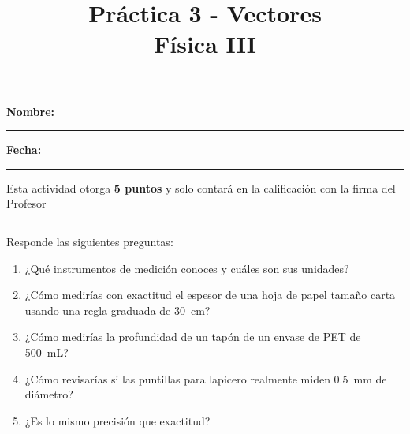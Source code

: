 \documentclass[14pt]{extarticle}
\title{\vspace*{-2cm} Práctica 3 - Vectores \\  Física III\vspace{-5ex}}
\date{}
\begin{document}
\maketitle

\textbf{Nombre:} \rule{7cm}{0.1mm} \textbf{Fecha:} \rule{3cm}{0.1mm}

\vspace{1cm}

\large
Esta actividad otorga \textbf{5 puntos} y solo contará en la calificación con la firma del Profesor \rule{4cm}{0.1mm}

\vspace*{1cm}
Responde las siguientes preguntas:

\begin{enumerate}
\itemsep4em
\item ¿Qué instrumentos de medición conoces y cuáles son sus unidades?
\item ¿Cómo medirías con exactitud el espesor de una hoja de papel tamaño carta usando una regla graduada de \SI{30}{\centi\meter}?
\item ¿Cómo medirías la profundidad de un tapón de un envase de PET de \SI{500}{\milli\liter}?
\item ¿Cómo revisarías si las puntillas para lapicero realmente miden \SI{0.5}{\milli\meter} de diámetro?
\item ¿Es lo mismo precisión que exactitud?
\end{enumerate}
\end{document}
